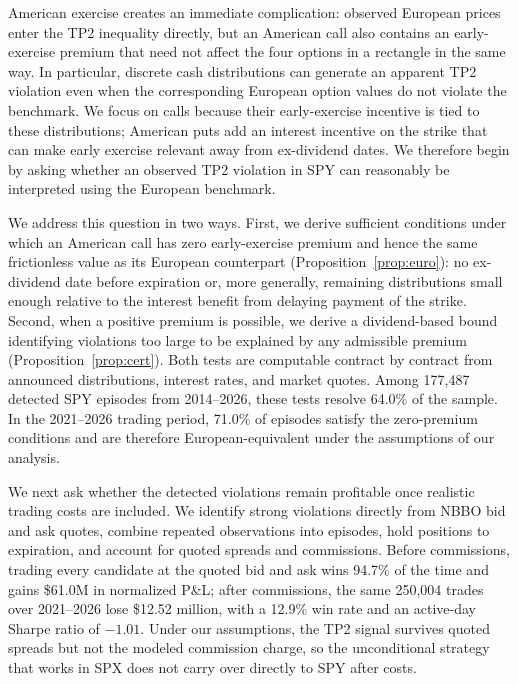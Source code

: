 \documentclass[sigconf,review,anonymous]{acmart}
\begin{document}
American exercise creates an immediate complication: observed European prices enter the TP2 inequality directly, but an American call also contains an early-exercise premium that need not affect the four options in a rectangle in the same way. In particular, discrete cash distributions can generate an apparent TP2 violation even when the corresponding European option values do not violate the benchmark. We focus on calls because their early-exercise incentive is tied to these distributions; American puts add an interest incentive on the strike that can make early exercise relevant away from ex-dividend dates. We therefore begin by asking whether an observed TP2 violation in SPY can reasonably be interpreted using the European benchmark.

We address this question in two ways. First, we derive sufficient conditions under which an American call has zero early-exercise premium and hence the same frictionless value as its European counterpart (Proposition~\ref{prop:euro}): no ex-dividend date before expiration or, more generally, remaining distributions small enough relative to the interest benefit from delaying payment of the strike. Second, when a positive premium is possible, we derive a dividend-based bound identifying violations too large to be explained by any admissible premium (Proposition~\ref{prop:cert}). Both tests are computable contract by contract from announced distributions, interest rates, and market quotes. Among 177{,}487 detected SPY episodes from 2014--2026, these tests resolve 64.0\% of the sample. In the 2021--2026 trading period, 71.0\% of episodes satisfy the zero-premium conditions and are therefore European-equivalent under the assumptions of our analysis.

We next ask whether the detected violations remain profitable once realistic trading costs are included. We identify strong violations directly from NBBO bid and ask quotes, combine repeated observations into episodes, hold positions to expiration, and account for quoted spreads and commissions. Before commissions, trading every candidate at the quoted bid and ask wins 94.7\% of the time and gains \$61.0M in normalized P\&L; after commissions, the same 250{,}004 trades over 2021--2026 lose \$12.52 million, with a 12.9\% win rate and an active-day Sharpe ratio of $-1.01$. Under our assumptions, the TP2 signal survives quoted spreads but not the modeled commission charge, so the unconditional strategy that works in SPX does not carry over directly to SPY after costs.
\end{document}
